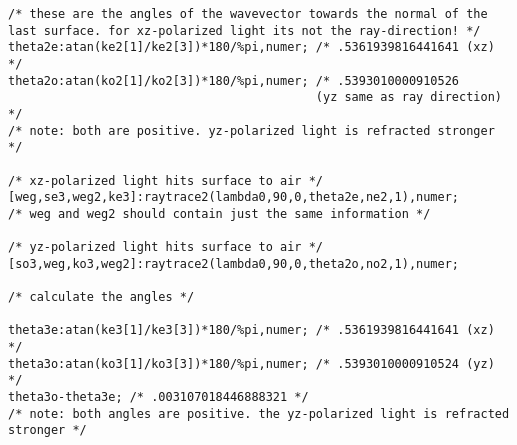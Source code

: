\begin{lstlisting}
/* these are the angles of the wavevector towards the normal of the
last surface. for xz-polarized light its not the ray-direction! */
theta2e:atan(ke2[1]/ke2[3])*180/%pi,numer; /* .5361939816441641 (xz) */
theta2o:atan(ko2[1]/ko2[3])*180/%pi,numer; /* .5393010000910526
                                           (yz same as ray direction) */
/* note: both are positive. yz-polarized light is refracted stronger */

/* xz-polarized light hits surface to air */
[weg,se3,weg2,ke3]:raytrace2(lambda0,90,0,theta2e,ne2,1),numer;
/* weg and weg2 should contain just the same information */

/* yz-polarized light hits surface to air */
[so3,weg,ko3,weg2]:raytrace2(lambda0,90,0,theta2o,no2,1),numer;

/* calculate the angles */

theta3e:atan(ke3[1]/ke3[3])*180/%pi,numer; /* .5361939816441641 (xz) */
theta3o:atan(ko3[1]/ko3[3])*180/%pi,numer; /* .5393010000910524 (yz) */
theta3o-theta3e; /* .003107018446888321 */
/* note: both angles are positive. the yz-polarized light is refracted
stronger */
\end{lstlisting}